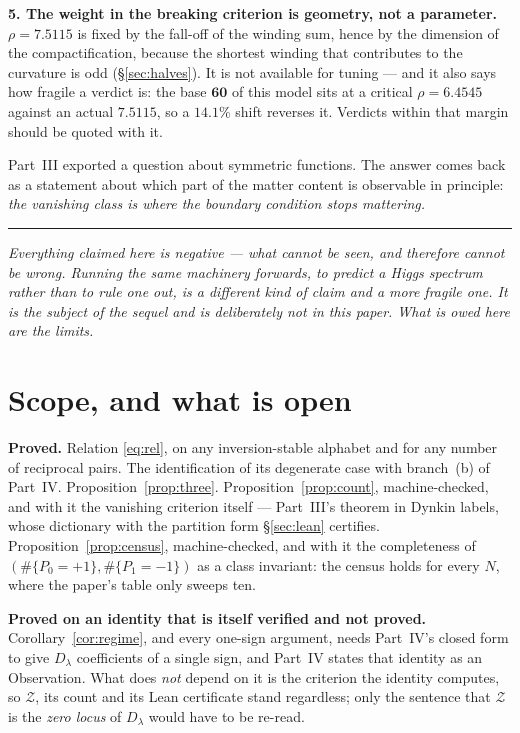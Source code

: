 \documentclass[11pt,a4paper]{article}
\newcommand{\Dl}{D_\lambda}
\newcommand{\bridge}[1]{\par\medskip\noindent
  \textcolor{hdrblue!45}{\rule{2.2cm}{0.6pt}}\;\;\parbox[t]{0.84\textwidth}{\small\itshape
  \textcolor{hdrblue!85}{#1}}\par\medskip}
\begin{document}
\textbf{5. The weight in the breaking criterion is geometry, not a parameter.} $\rho=7.5115$ is
fixed by the fall-off of the winding sum, hence by the dimension of the compactification, because the
shortest winding that contributes to the curvature is odd (\S\ref{sec:halves}). It is not available
for tuning --- and it also says how fragile a verdict is: the base $\mathbf{60}$ of this model sits at
a critical $\rho=6.4545$ against an actual $7.5115$, so a $14.1\%$ shift reverses it. Verdicts within
that margin should be quoted with it.

\medskip
Part~III exported a question about symmetric functions. The answer comes back as a statement about
which part of the matter content is observable in principle: \emph{the vanishing class is where the
boundary condition stops mattering.}

\bridge{Everything claimed here is negative --- what cannot be seen, and therefore cannot be wrong.
Running the same machinery \emph{forwards}, to predict a Higgs spectrum rather than to rule one out,
is a different kind of claim and a more fragile one. It is the subject of the sequel and is
deliberately not in this paper. What is owed here are the limits.}

\section{Scope, and what is open}\label{sec:scope}

\textbf{Proved.} Relation \eqref{eq:rel}, on any inversion-stable alphabet and for any number of
reciprocal pairs. The identification of its degenerate case with branch~(b) of Part~IV.
Proposition~\ref{prop:three}. Proposition~\ref{prop:count}, machine-checked, and with it the
vanishing criterion itself --- Part~III's theorem in Dynkin labels, whose dictionary with the
partition form \S\ref{sec:lean} certifies. Proposition~\ref{prop:census}, machine-checked, and with
it the completeness of $(\#\{P_0{=}+1\},\#\{P_1{=}-1\})$ as a class invariant: the census holds for
every $N$, where the paper's table only sweeps ten.

\textbf{Proved on an identity that is itself verified and not proved.} Corollary~\ref{cor:regime},
and every one-sign argument, needs Part~IV's closed form to give $\Dl$ coefficients of a single sign,
and Part~IV states that identity as an Observation. What does \emph{not} depend on it is the
criterion the identity computes, so $\mathcal Z$, its count and its Lean certificate stand
regardless; only the sentence that $\mathcal Z$ is the \emph{zero locus} of $\Dl$ would have to be
re-read.
\end{document}

